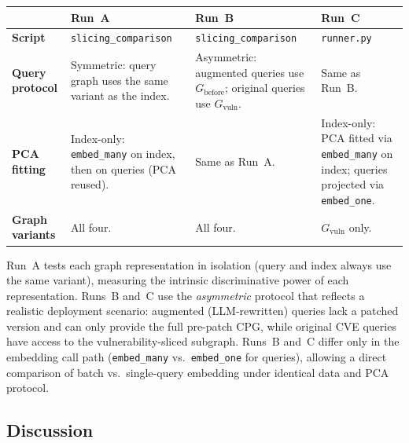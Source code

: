 \documentclass[11pt, a4paper]{article}
\begin{document}
  \begin{center}
  \small
  \renewcommand{\arraystretch}{1.3}
  \begin{tabular}{p{2.5cm}p{3.8cm}p{3.8cm}p{3.8cm}}
    \toprule
    & \textbf{Run~A} & \textbf{Run~B} & \textbf{Run~C} \\
    \midrule
    \textbf{Script}
      & \texttt{slicing\_comparison}
      & \texttt{slicing\_comparison}
      & \texttt{runner.py} \\
    \textbf{Query protocol}
      & Symmetric: query graph uses the same variant as the index.
      & Asymmetric: augmented queries use $G_{\mathrm{before}}$;
        original queries use $G_{\mathrm{vuln}}$.
      & Same as Run~B. \\
    \textbf{PCA fitting}
      & Index-only: \texttt{embed\_many} on index, then on queries
        (PCA reused).
      & Same as Run~A.
      & Index-only: PCA fitted via \texttt{embed\_many} on
        index; queries projected via \texttt{embed\_one}. \\
    \textbf{Graph variants}
      & All four.
      & All four.
      & $G_{\mathrm{vuln}}$ only. \\
    \bottomrule
  \end{tabular}
  \end{center}

  Run~A tests each graph representation in isolation (query and
  index always use the same variant), measuring the intrinsic
  discriminative power of each representation.
  Runs~B and~C use the \emph{asymmetric} protocol that reflects
  a realistic deployment scenario: augmented (LLM-rewritten)
  queries lack a patched version and can only provide the full
  pre-patch CPG, while original CVE queries have access to the
  vulnerability-sliced subgraph.
  Runs~B and~C differ only in the embedding call path
  (\texttt{embed\_many} vs.\ \texttt{embed\_one} for queries),
  allowing a direct comparison of batch vs.\ single-query
  embedding under identical data and PCA protocol.

\subsection*{Discussion}
\end{document}

